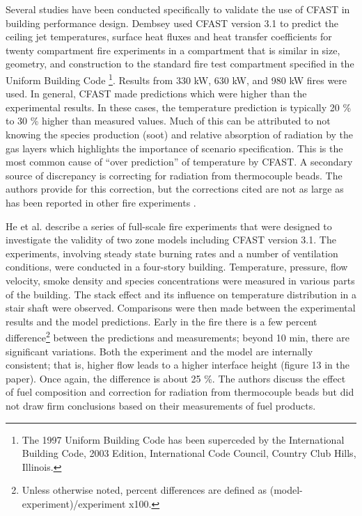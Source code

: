 Several studies have been conducted specifically to validate the use of CFAST in building performance design. Dembsey   \cite{Valid:Dempsey} used CFAST version 3.1 to predict the ceiling jet temperatures, surface heat fluxes and heat transfer coefficients for twenty compartment fire experiments in a compartment that is similar in size, geometry, and construction to the standard fire test compartment specified in the Uniform Building Code \cite{UBC}\footnote{The 1997 Uniform Building Code has been superceded by the International Building Code, 2003 Edition, International Code Council, Country Club Hills, Illinois.}. Results from 330 kW, 630 kW, and 980 kW fires were used. In general, CFAST made predictions which were higher than the experimental results. In these cases, the temperature prediction is typically 20 \% to 30 \% higher than measured values. Much of this can be attributed to not knowing the species production (soot) and relative absorption of radiation by the gas layers which highlights the importance of scenario specification. This is the most common cause of  ``over prediction'' of temperature by CFAST. A secondary source of discrepancy is correcting for radiation from thermocouple beads. The authors provide for this correction, but the corrections cited are not as large as has been reported in other fire experiments \cite{Valid:Pitts}.

He et al. \cite{Valid:He} describe a series of full-scale fire experiments that were designed to investigate the validity of two zone models including CFAST version 3.1. The experiments, involving steady state burning rates and a number of ventilation conditions, were conducted in a four-story building. Temperature, pressure, flow velocity, smoke density and species concentrations were measured in various parts of the building. The stack effect and its influence on temperature distribution in a stair shaft were observed. Comparisons were then made between the experimental results and the model predictions. Early in the fire there is a few percent difference\footnote{Unless otherwise noted, percent differences are defined as (model-experiment)/experiment x100.} between the predictions and measurements; beyond 10 min, there are significant variations. Both the experiment and the model are internally consistent; that is, higher flow leads to a higher interface height (figure 13 in the paper). Once again, the difference is about 25 \%. The authors discuss the effect of fuel composition and correction for radiation from thermocouple beads but did not draw firm conclusions based on their measurements of fuel products.

